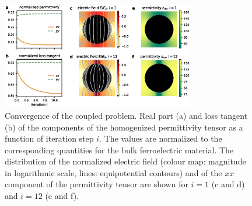 \documentclass[%
 aip,
 amsmath,amssymb,
 reprint,%
]{revtex4-1}
\newcommand{\co}[1]{#1}
\begin{document}
\begin{figure}[!t]
 \centering
 \includegraphics[width=0.75\textwidth]{convergence_per}
 \caption{Convergence of the coupled problem.
  Real part (a) and loss tangent (b) of the components of the homogenized
  permittivity tensor as a function of iteration step $i$. \co{The values are normalized to the corresponding quantities for the bulk ferroelectric material.} The distribution of
  the normalized electric field (colour map: magnitude in logarithmic scale,
  lines: equipotential contours) and of the
  $xx$ component of the permittivity tensor are shown for $i=1$
  (c and d) and $i=12$ (e and f).
 }
 \label{conv2D}
\end{figure}

\end{document}
